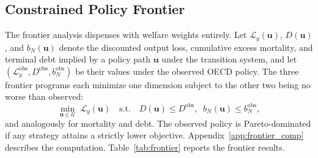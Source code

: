 \documentclass[12pt, a4paper]{article}
\begin{document}
\subsection{Constrained Policy Frontier}
\label{sec:frontier}

The frontier analysis dispenses with welfare weights entirely. Let
\(\mathcal{L}_y(\bm{u})\), \(D(\bm{u})\), and \(b_N(\bm{u})\) denote the
discounted output loss, cumulative excess mortality, and terminal debt implied
by a policy path \(\bm{u}\) under the transition system, and let
\((\mathcal{L}_y^{\text{obs}}, D^{\text{obs}}, b_N^{\text{obs}})\) be their
values under the observed OECD policy. The three frontier programs each minimize
one dimension subject to the other two being no worse than observed:
\begin{equation}
  \min_{\bm{u} \in \mathcal{U}} \; \mathcal{L}_y(\bm{u})
  \quad \text{s.t.} \quad
  D(\bm{u}) \le D^{\text{obs}}, \;\; b_N(\bm{u}) \le b_N^{\text{obs}},
  \label{eq:frontier_program}
\end{equation}
and analogously for mortality and debt. The observed policy is Pareto-dominated if any strategy attains a strictly lower objective. Appendix~\ref{app:frontier_comp} describes the computation. Table~\ref{tab:frontier} reports the frontier results. 
\end{document}
